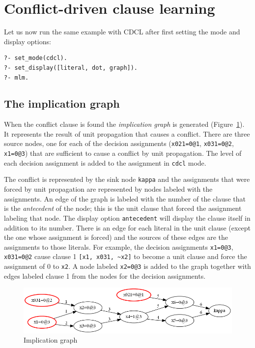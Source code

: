 \documentclass[11pt]{report}
\newcommand*{\p}[1]{\textup{\texttt{#1}}}
\begin{document}
\clearpage

\section{Conflict-driven clause learning}

Let us now run the same example with CDCL after first setting the mode
and display options:

\begin{verbatim}
?- set_mode(cdcl).
?- set_display([literal, dot, graph]).
?- mlm.
\end{verbatim}

\subsection{The implication graph}

When the conflict clause is found the \emph{implication graph} is
generated (Figure~\ref{fig.graph}). It represents the result of unit
propagation that causes a conflict. There are three source nodes, one
for each of the decision assignments (\p{x021=0@1}, \p{x031=0@2},
\p{x1=0@3}) that are sufficient to cause a conflict by unit propagation.
The level of each decision assignment is added to the assignment in
\p{cdcl} mode.

The conflict is represented by the sink node \p{kappa} and the
assignments that were forced by unit propagation are represented by
nodes labeled with the assignments. An edge of the graph is labeled with
the number of the clause that is the \emph{antecedent} of the node; this
is the unit clause that forced the assignment labeling that
node. The display option \p{antecedent} will display the clause
itself in addition to its number. There is an edge for each literal in
the unit clause (except the one whose assignment is forced) and the
sources of these edges are the assignments to those literals. For
example, the decision assignments \p{x1=0@3}, \p{x031=0@2}
cause clause 1 \verb+[x1, x031, ~x2]+ to become a unit clause
and force the assignment of 0 to \p{x2}. A node labeled \p{x2=0@3} is
added to the graph together with edges labeled clause 1 from the
nodes for the decision assignments.

\begin{figure}
\begin{center}
\includegraphics[keepaspectratio=true,width=\textwidth]{graph}
\end{center}
\caption{Implication graph}\label{fig.graph}
\end{figure}
\end{document}

